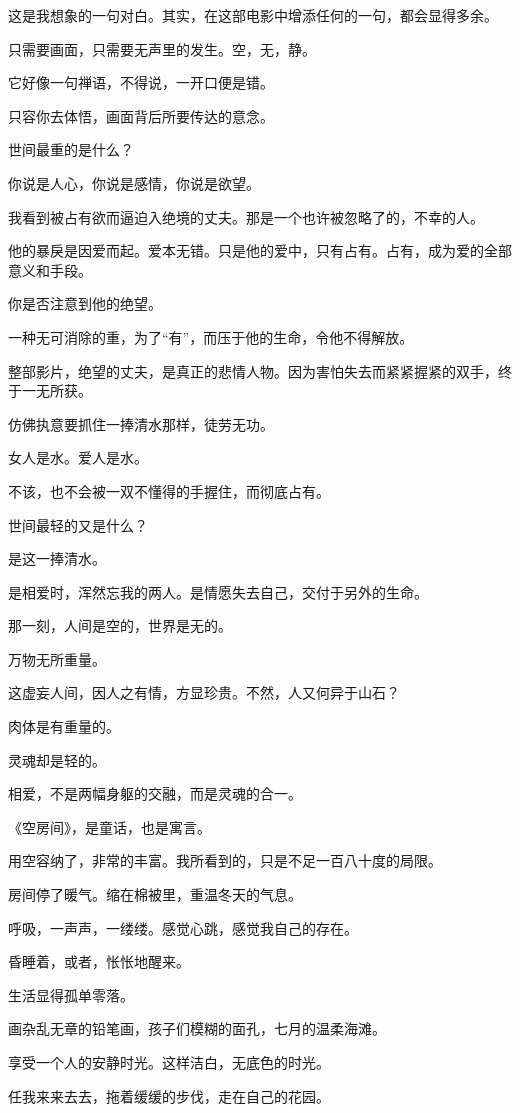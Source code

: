 \documentclass[12pt,a4paper]{article}
\begin{document}
		这是我想象的一句对白。其实，在这部电影中增添任何的一句，都会显得多余。\par
		只需要画面，只需要无声里的发生。空，无，静。\par
		它好像一句禅语，不得说，一开口便是错。\par
		只容你去体悟，画面背后所要传达的意念。

		世间最重的是什么？\par
		你说是人心，你说是感情，你说是欲望。\par
		我看到被占有欲而逼迫入绝境的丈夫。那是一个也许被忽略了的，不幸的人。\par
		他的暴戾是因爱而起。爱本无错。只是他的爱中，只有占有。占有，成为爱的全部意义和手段。\par
		你是否注意到他的绝望。\par
		一种无可消除的重，为了“有”，而压于他的生命，令他不得解放。\par
		整部影片，绝望的丈夫，是真正的悲情人物。因为害怕失去而紧紧握紧的双手，终于一无所获。\par
		仿佛执意要抓住一捧清水那样，徒劳无功。\par
		女人是水。爱人是水。\par
		不该，也不会被一双不懂得的手握住，而彻底占有。\par
		世间最轻的又是什么？\par
		是这一捧清水。\par
		是相爱时，浑然忘我的两人。是情愿失去自己，交付于另外的生命。\par
		那一刻，人间是空的，世界是无的。\par
		万物无所重量。\par
		这虚妄人间，因人之有情，方显珍贵。不然，人又何异于山石？\par
		肉体是有重量的。\par
		灵魂却是轻的。\par
		相爱，不是两幅身躯的交融，而是灵魂的合一。

		《空房间》，是童话，也是寓言。\par
		用空容纳了，非常的丰富。我所看到的，只是不足一百八十度的局限。

	\endwriting



		房间停了暖气。缩在棉被里，重温冬天的气息。\par
		呼吸，一声声，一缕缕。感觉心跳，感觉我自己的存在。

		昏睡着，或者，怅怅地醒来。\par
		生活显得孤单零落。\par
		画杂乱无章的铅笔画，孩子们模糊的面孔，七月的温柔海滩。\par
		享受一个人的安静时光。这样洁白，无底色的时光。\par
		任我来来去去，拖着缓缓的步伐，走在自己的花园。
\end{document}
